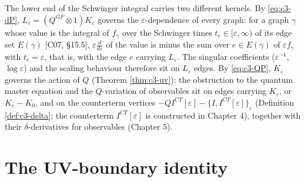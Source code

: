 \begin{remark}[Two objects at $t=\varepsilon$]
\label{rem:c3-two}
The lower end of the Schwinger integral carries two different kernels. By \eqref{eq:c3-dP}, $L_\varepsilon=(Q^{GF}\otimes1)K_\varepsilon$ governs the $\varepsilon$-dependence of every graph: for a graph $\gamma$ whose value is the integral of $f_\gamma$ over the Schwinger times $t_e\in[\varepsilon,\infty)$ of its edge set $E(\gamma)$ [C07, §15.5], $\varepsilon\frac{d}{d\varepsilon}$ of the value is minus the sum over $e\in E(\gamma)$ of $\varepsilon f_\gamma$ with $t_e=\varepsilon$, that is, with the edge $e$ carrying $L_\varepsilon$. The singular coefficients ($\varepsilon^{-1}$, $\log\varepsilon$) and the scaling behaviour therefore sit on $L_\varepsilon$ edges. By \eqref{eq:c3-QP}, $K_\varepsilon$ governs the action of $Q$ (Theorem \ref{thm:c3-uv}): the obstruction to the quantum master equation and the $Q$-variation of observables sit on edges carrying $K_\varepsilon$, or $K_\varepsilon-K_0$, and on the counterterm vertices $-QI^{CT}[\varepsilon]-\{I,I^{CT}[\varepsilon]\}_\varepsilon$ (Definition \ref{def:c3-delta}; the counterterm $I^{CT}[\varepsilon]$ is constructed in Chapter 4), together with their $\delta$-derivatives for observables (Chapter 5).
\end{remark}

\section{The UV-boundary identity}


